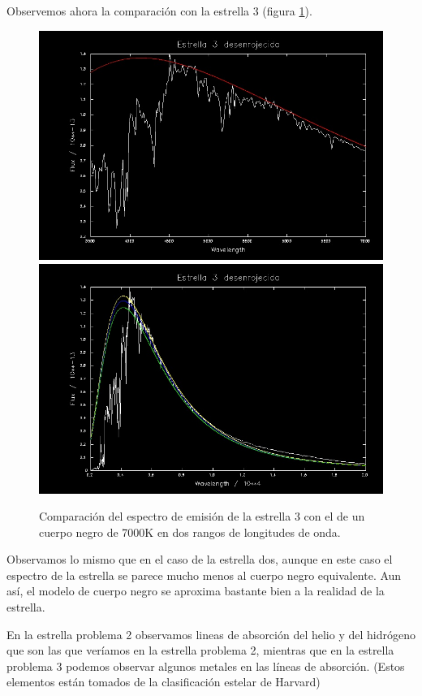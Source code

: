 \documentclass{aa} %
\begin{document}
Observemos ahora la comparación con la estrella 3 (figura \ref{fig:bbody3}).

\begin{figure}[h!]
\begin{center}
\includegraphics[scale=0.15]{3 bbody.png}
\includegraphics[scale=0.15]{3 bigger.png}
\caption{Comparación del espectro de emisión de la estrella 3 con el de un cuerpo negro de 7000K en dos rangos de longitudes de onda.}
\label{fig:bbody3}
\end{center}
\end{figure}

Observamos lo mismo que en el caso de la estrella dos, aunque en este caso el espectro de la estrella se parece mucho menos al cuerpo negro equivalente. Aun así, el modelo de cuerpo negro se aproxima bastante bien a la realidad de la estrella.

En la estrella problema 2 observamos lineas de absorción del helio y del hidrógeno que son las que veríamos en la estrella problema 2, mientras que en la estrella problema 3 podemos observar algunos metales en las líneas de absorción. (Estos elementos están tomados de la clasificación estelar de Harvard)
\end{document}
